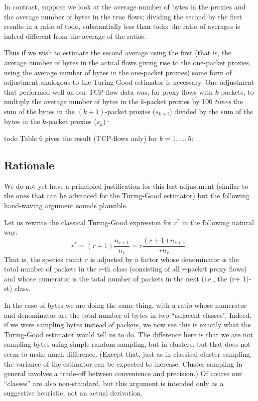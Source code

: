 \documentclass{paper}
\begin{document}
In contrast, suppose we look at the average number of bytes in the proxies and
the average number of bytes in the true flows; dividing the second by the first
results in a ratio of todo, substantially less than todo: the ratio of averages
is indeed different from the average of the ratios.

Thus if we wish to estimate the second average using the first (that is, the
average number of bytes in the actual flows giving rise to the one-packet
proxies, using the average number of bytes in the one-packet proxies) some form
of adjustment analogous to the Turing-Good estimator is necessary. One
adjustment that performed well on our TCP-flow data was, for proxy flows with
$k$ packets, to multiply the average number of bytes in the $k$-packet proxies by
100 \emph{times} the sum of the bytes in the $(k + 1)$-packet proxies ($s_{k+i}$)
divided by the sum of the bytes in the $k$-packet proxies ($s_k$)·

todo Table 6 gives the result (TCP-flows only) for $k = 1, \dots, 5$:

\subsection{Rationale}

We do not yet have a principled justification for this last adjustment (similar
to the ones that can be advanced for the Turing-Good estimator) but the
following hand-waving argument sounds plausible.

Let us rewrite the classical Turing-Good expression for $r^*$ in the following
natural way:
$$ r^* =(r + 1) \frac{n_{r+1}}{n_r} = r \frac{(r+1)n_{r+1}}{rn_r}. $$
That is, the species count $r$ is adjusted by a factor whose denominator is the
total number of packets in the $r$-th class (consisting of all $r$-packet proxy
flows) and whose numerator is the total number of packets in the next (i.e.,
the (r+ 1)- st) class.

In the case of bytes we are doing the same thing, with a ratio whose numerator
and denominator are the total number of bytes in two ``adjacent classes''.
Indeed, if we were sampling bytes instead of packets, we now see this is
exactly what the Turing-Good estimator would tell us to do. The difference here
is that we are not sampling bytes using simple random sampling, but in
clusters, but that does not seem to make much difference. (Except that, just as
in classical cluster sampling, the variance of the estimator can be expected to
increase. Cluster sampling in general involves a trade-off between convenience
and precision.) Of course our ``classes'' are also non-standard, but this
argument is intended only as a suggestive heuristic, not an actual derivation.
\end{document}
